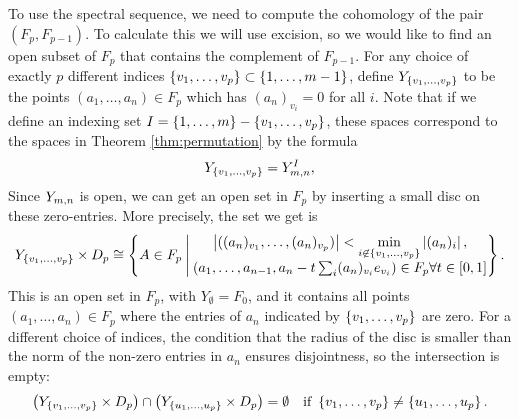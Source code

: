 To use the spectral sequence, we need to compute the cohomology of the
pair $(F_p,F_{p-1})$. To calculate this we will use excision, so we
would like to find an open subset of $F_p$ that contains the
complement of $F_{p-1}$. For any choice of exactly $p$ 
different indices $\left\{ v_1,\dots,v_p \right\}\subset \left\{ 1,\dots,m-1 \right\}$,
define $Y_{\left\{ v_1,\dots,v_p \right\}}$ to be the points $(a_1,\dots,a_n)\in
F_p$ which has $(a_n)_{v_i} = 0$ for all $i$.
Note that if we define an indexing set ${I =
  \left\{ 1,\dots,m \right\}-\left\{ v_1,\dots,v_p \right\}}$,
these spaces correspond to the spaces in Theorem
\ref{thm:permutation} by the formula
\[ Y_{\left\{ v_1,\dots,v_p \right\}} = Y_{m,n}^I, \]
Since $Y_{m,n}$ is open, we
can get an open set in $F_p$ by inserting a small disc on these
zero-entries. More precisely, the set we get is
\[ Y_{\left\{ v_1,\dots,v_p \right\}} \times D_p \cong \left\{  A\in F_p \:\Bigg\vert\: 
  \begin{matrix} \displaystyle 
    \left| ((a_n)_{v_1},\dots,(a_n)_{v_p}) \right| <
    \min_{i\not\in \left\{ v_1,\dots,v_p \right\}} \left| (a_n)_i \right|, \\
    \left(a_1,\dots,a_{n-1},a_n-t\sum_{i} (a_n)_{v_i}e_{v_i}\right)\in
    F_p \forall t \in [0,1]
  \end{matrix}  \right\}. \]
This is an open set in $F_p$, with $Y_{\emptyset} = F_0$, and it
contains all points $(a_1,\dots,a_n)\in F_p$ where the entries of
$a_n$ indicated by $\left\{ v_1,\dots,v_p \right\}$ are zero. For a different
choice of indices, the condition that the radius of the disc is
smaller than the norm of the non-zero entries in $a_n$ ensures
disjointness, so the intersection is empty:
\[ \left(Y_{\left\{ v_1,\dots,v_p \right\}}\times D_p\right) \cap \left(
  Y_{\left\{ u_1,\dots,u_p \right\}}\times D_p\right) = \emptyset \quad \text{if }
\left\{ v_1,\dots,v_p \right\} \neq \left\{ u_1,\dots,u_p \right\}. \]

